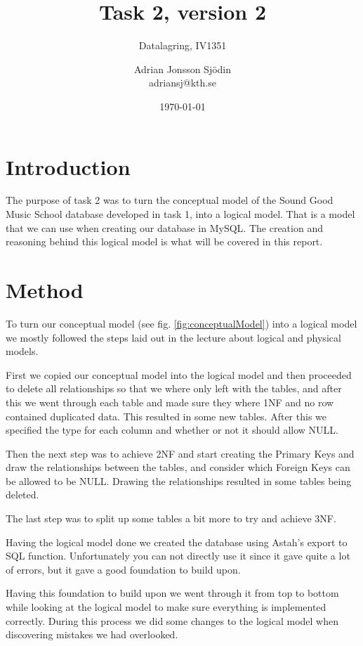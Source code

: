 \documentclass[a4paper]{scrreprt}
\title{Task 2, version 2}
\subtitle{Datalagring, IV1351}
\author{Adrian Jonsson Sjödin \\ adriansj@kth.se}
\date{\today}
\begin{document}
\maketitle

\tableofcontents %

\chapter{Introduction}
The purpose of task 2 was to turn the conceptual model of the Sound Good Music School database developed in task 1, into a logical model. That is a model that we can 
use when creating our database in MySQL. The creation and reasoning behind this logical model is what will be covered in this report.



\chapter{Method}
To turn our conceptual model (see fig. \ref{fig:conceptualModel}) into a logical model we mostly followed the steps laid out in the lecture about logical and physical models.

First we copied our conceptual model into the logical model and then proceeded to delete all relationships so that we where only left with the tables, and after this we 
went through each table and made sure they where 1NF and no row contained duplicated data. This resulted in some new tables. After this we specified the type for each column 
and whether or not it should allow NULL.

Then the next step was to achieve 2NF and start creating the Primary Keys and draw the relationships between the tables, and consider which Foreign Keys can be allowed 
to be NULL. Drawing the relationships resulted in some tables being deleted.

The last step was to split up some tables a bit more to try and achieve 3NF.

Having the logical model done we created the database using Astah's export to SQL function. Unfortunately you can not directly use it since it gave quite a lot of errors,
but it gave a good foundation to build upon.

Having this foundation to build upon we went through it from top to bottom while looking at the logical model to make sure everything is implemented correctly. During this process 
we did some changes to the logical model when discovering mistakes we had overlooked. 
\end{document}
